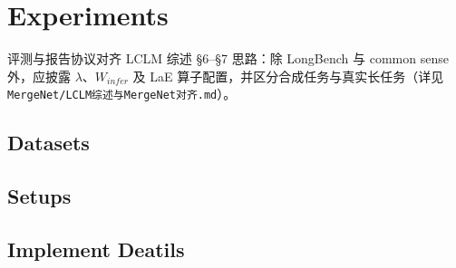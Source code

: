 \documentclass[a4paper,11pt]{ctexart}
\begin{document}
\section{Experiments}
评测与报告协议对齐 LCLM 综述 \S6--\S7 思路：除 LongBench 与 common sense 外，应披露 $\lambda$、$W_{infer}$ 及 LaE 算子配置，并区分合成任务与真实长任务（详见 \texttt{MergeNet/LCLM综述与MergeNet对齐.md}）。



\subsection{Datasets}

\subsection{Setups}

\subsection{Implement Deatils}
\end{document}
